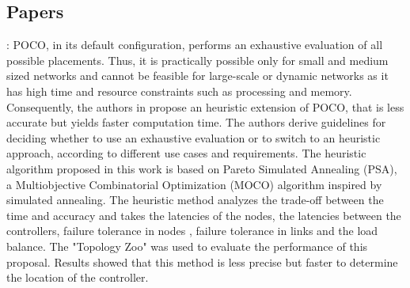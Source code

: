 \documentclass[a4paper,10pt]{article}
\begin{document}
\subsection{Papers}
\cite{LaGe15}: POCO, in its default configuration, performs an exhaustive evaluation of all possible placements. Thus, it is practically possible only for small and medium sized networks and cannot be feasible for large-scale or dynamic networks as it has high time and resource constraints such as processing and memory. 
Consequently, the authors in \cite{LaGe15} propose an heuristic extension of POCO, that is less accurate but yields faster computation time. The authors derive guidelines for deciding whether to use an exhaustive evaluation or to switch to an heuristic approach, according to different use cases and requirements. The heuristic algorithm proposed in this work is based on Pareto Simulated Annealing (PSA), a Multiobjective Combinatorial Optimization (MOCO) algorithm inspired by simulated annealing. The heuristic method analyzes the trade-off between the time and accuracy and takes the latencies of the nodes, the latencies between the controllers, failure tolerance in nodes , failure tolerance in links and the load balance. The "Topology Zoo" was used to evaluate the performance of this proposal. Results showed that this method is less precise but faster to determine the location of the controller.
\end{document}
